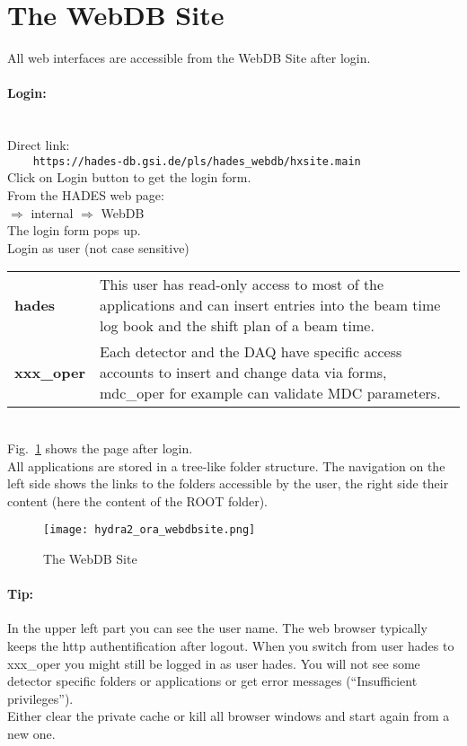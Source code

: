 \section[The WebDB Site]{The WebDB Site} \label{sec:oraWebdbSite}

All web interfaces are accessible from the WebDB Site after login.
\paragraph{Login:} ~\\
Direct link:\\
\verb+    https://hades-db.gsi.de/pls/hades_webdb/hxsite.main+\\
Click on Login button to get the login form.\\

From the HADES web page:\\
 $\Rightarrow$ internal $\Rightarrow$ WebDB\\
The login form pops up.\\

Login as user (not case sensitive)\\
\begin{tabular}{l p{14cm}}
\textbf{hades}     & This user has read-only access to most of the applications and can insert entries into the 
                   beam time log book and the shift plan of a beam time. \\
\textbf{xxx\_oper} & Each detector and the DAQ have specific access accounts to insert and change data via forms, 
                   mdc\_oper for example can validate MDC parameters. \\
\end{tabular}\\

Fig.~\ref{fig:oraWebdbSite} shows the page after login.\\
All applications are stored in a tree-like folder structure. The navigation on the left side shows the links to the folders 
accessible by the user, the right side their content (here the content of the ROOT folder).

\begin{figure}[\htb]
  \centering
  \texttt{[image: hydra2\_ora\_webdbsite.png]}
  \caption[The WebDB Site]{The WebDB Site}
  \label{fig:oraWebdbSite}
\end{figure}

\paragraph{Tip:} In the upper left part you can see the user name. The web browser typically keeps the http authentification 
after logout. When you switch from user hades to xxx\_oper you might still be logged in as user hades. You will not 
see some detector specific folders or applications or get error messages (``Insufficient privileges'').\\
Either clear the private cache or kill all browser windows and start again from a new one.  

